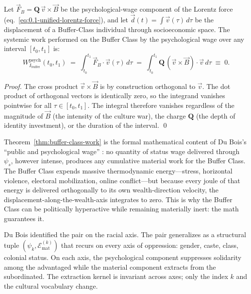 \begin{theorem}
\label{thm:buffer-class-work}
Let $\vec{F}_B = \mathbf{Q}\,\vec{v} \times \vec{B}$ be the
psychological-wage component of the Lorentz force
(eq.~\ref{eq:0.1-unified-lorentz-force}), and let
$\vec{d}(t) = \int \vec{v}(\tau)\, d\tau$ be the displacement of a
Buffer-Class individual through socioeconomic space. The systemic work
performed on the Buffer Class by the psychological wage over any
interval $[t_0, t_1]$ is:
\begin{equation}\label{eq:0.15-buffer-class-work-theorem}
W_{I_{\text{buffer}}}^{\text{psych}}(t_0, t_1) \;=\; \int_{t_0}^{t_1} \vec{F}_B \cdot \vec{v}(\tau)\, d\tau \;=\; \int_{t_0}^{t_1} \mathbf{Q}\,(\vec{v} \times \vec{B}) \cdot \vec{v}\, d\tau \;\equiv\; 0.
\end{equation}
\end{theorem}

\begin{proof}
The cross product $\vec{v} \times \vec{B}$ is by construction
orthogonal to $\vec{v}$. The dot product of orthogonal vectors is
identically zero, so the integrand vanishes pointwise for all
$\tau \in [t_0, t_1]$. The integral therefore vanishes regardless of
the magnitude of $\vec{B}$ (the intensity of the culture war), the
charge $\mathbf{Q}$ (the depth of identity investment), or the
duration of the interval. \qed
\end{proof}

Theorem~\ref{thm:buffer-class-work} is the formal mathematical
content of Du Bois's ``public and psychological wage'' \cite{dubois}:
no quantity of status wage delivered through $\psi_s$, however
intense, produces any cumulative material work for the Buffer Class.
The Buffer Class expends massive thermodynamic energy---stress,
horizontal violence, electoral mobilization, online conflict---but
because every joule of that energy is delivered orthogonally to its
own wealth-direction velocity, the displacement-along-the-wealth-axis
integrates to zero. This is why the Buffer Class can be politically
hyperactive while remaining materially inert: the math guarantees it.

Du Bois identified the pair on the racial axis. The pair generalizes as a structural tuple
$(\psi_{k}, \mathcal{E}_{\text{mat}}^{(k)})$ that recurs on every axis
of oppression: gender, caste, class, colonial status. On each axis,
the psychological component suppresses solidarity among the
advantaged while the material component extracts from the
subordinated. The extraction kernel is invariant across axes; only
the index $k$ and the cultural vocabulary change.

